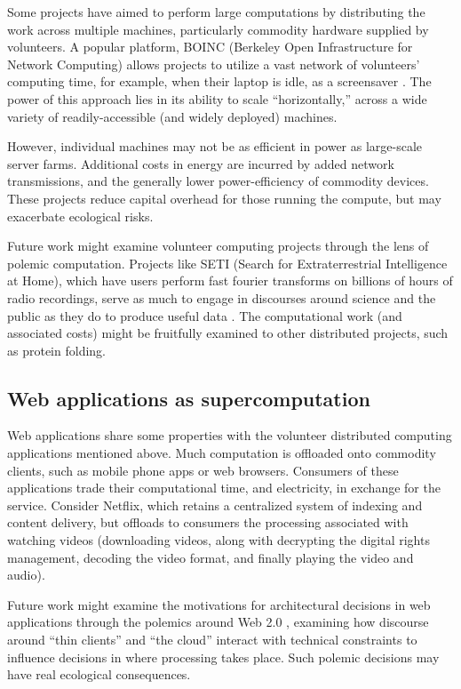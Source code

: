 \documentclass[sigconf]{acmart}
\begin{document}
Some projects have aimed to perform large computations by distributing the work across multiple machines,
particularly commodity hardware supplied by volunteers.
A popular platform, BOINC (Berkeley Open Infrastructure for Network Computing)
allows projects to utilize a vast network of volunteers' computing time, 
for example, when their laptop is idle, as a screensaver
\cite{Anderson2004}.
The power of this approach lies in its ability to scale ``horizontally,''
across a wide variety of readily-accessible (and widely deployed) machines.

However, individual machines may not be as efficient in power 
as large-scale server farms.
Additional costs in energy are incurred by added network transmissions,
and the generally lower power-efficiency of commodity devices.
These projects reduce capital overhead for those running the compute,
but may exacerbate ecological risks.

Future work might examine volunteer computing projects through the lens of polemic computation.
Projects like SETI (Search for Extraterrestrial Intelligence at Home), which have users perform fast fourier transforms on billions of hours of radio recordings,
serve as much to engage in discourses around science and the public as they do to produce useful data 
\cite{Anderson2004}.
The computational work (and associated costs) might be fruitfully examined to other distributed projects, 
such as protein folding.


\subsection{Web applications as supercomputation}
\label{sec:orgf905549}

Web applications share some properties with the volunteer distributed computing applications mentioned above.
Much computation is offloaded onto commodity clients, such as mobile phone apps or web browsers.
Consumers of these applications trade their computational time, and electricity, in exchange for the service.
Consider Netflix, which retains a centralized system of indexing and content delivery,
but offloads to consumers the processing associated with watching videos 
(downloading videos, along with decrypting the digital rights management, decoding the video format, and finally playing the video and audio).

Future work might examine the motivations for architectural decisions in web applications through 
the polemics around Web 2.0 
\cite{Scholz2008},
examining how discourse around ``thin clients'' and ``the cloud''
interact with technical constraints
to influence decisions in where processing takes place.
Such polemic decisions may have real ecological consequences.
\end{document}
